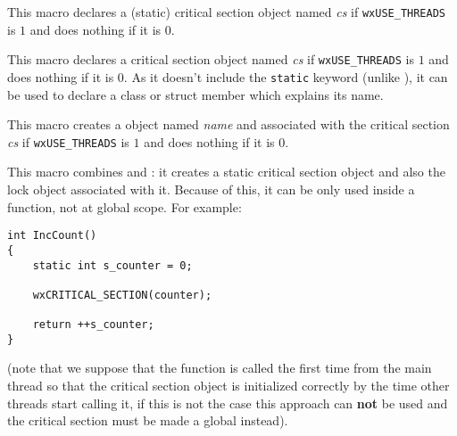 \label{wxcritsectdeclare}


This macro declares a (static) critical section object named {\it cs} if 
{\tt wxUSE\_THREADS} is $1$ and does nothing if it is $0$.



\label{wxcritsectdeclaremember}


This macro declares a critical section object named {\it cs} if 
{\tt wxUSE\_THREADS} is $1$ and does nothing if it is $0$. As it doesn't
include the {\tt static} keyword (unlike 
), it can be used to declare
a class or struct member which explains its name.



\label{wxcritsectlocker}


This macro creates a  
object named {\it name} and associated with the critical section {\it cs} if 
{\tt wxUSE\_THREADS} is $1$ and does nothing if it is $0$.



\label{wxcriticalsectionmacro}


This macro combines  and 
: it creates a static critical
section object and also the lock object associated with it. Because of this, it
can be only used inside a function, not at global scope. For example:

\begin{verbatim}
int IncCount()
{
    static int s_counter = 0;

    wxCRITICAL_SECTION(counter);

    return ++s_counter;
}
\end{verbatim}

(note that we suppose that the function is called the first time from the main
thread so that the critical section object is initialized correctly by the time
other threads start calling it, if this is not the case this approach can 
{\bf not} be used and the critical section must be made a global instead).



